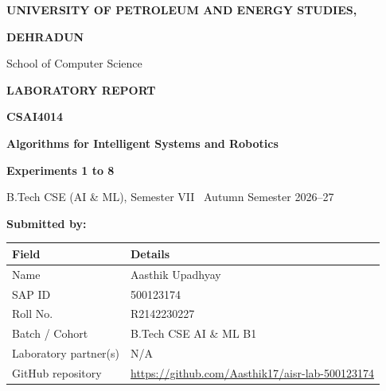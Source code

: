 \documentclass[12pt,a4paper]{report}
\begin{document}
\begin{titlepage}
    \centering
    \vspace*{0.5cm}
    
    {\fontsize{18}{22}\selectfont \textbf{UNIVERSITY OF PETROLEUM AND ENERGY STUDIES,}\par}
    {\fontsize{16}{20}\selectfont \textbf{DEHRADUN}\par}
    \vspace{0.4cm}
    {\fontsize{14}{18}\selectfont School of Computer Science\par}
    
    \vspace{2.0cm}
    
    {\fontsize{20}{24}\selectfont \textbf{LABORATORY REPORT}\par}
    \vspace{0.6cm}
    {\fontsize{15}{19}\selectfont \textbf{CSAI4014}\par}
    \vspace{0.3cm}
    {\fontsize{16}{20}\selectfont \textbf{Algorithms for Intelligent Systems and Robotics}\par}
    \vspace{0.5cm}
    {\fontsize{13}{17}\selectfont \textbf{Experiments 1 to 8}\par}
    \vspace{0.3cm}
    {\fontsize{12}{16}\selectfont B.Tech CSE (AI \& ML), Semester VII \textbar\ Autumn Semester 2026--27\par}
    
    \vspace{1.8cm}
    
    \begin{flushleft}
    {\fontsize{12}{15}\selectfont \textbf{Submitted by:}\par}
    \vspace{0.2cm}
    \end{flushleft}
    
    \begin{center}
    \begin{tabular}{|p{4.5cm}|p{9.5cm}|}
    \hline
    \rowcolor{headergray}
    \textbf{Field} & \textbf{Details} \\ \hline
    Name & Aasthik Upadhyay \\ \hline
    SAP ID & 500123174 \\ \hline
    Roll No. & R2142230227 \\ \hline
    Batch / Cohort & B.Tech CSE AI \& ML B1 \\ \hline
    Laboratory partner(s) & N/A \\ \hline
    GitHub repository & \url{https://github.com/Aasthik17/aisr-lab-500123174} \\ \hline
    \end{tabular}
    \end{center}
    

\end{titlepage}
\end{document}
